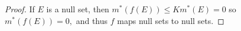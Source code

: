 \documentclass{article}
\begin{document}
\begin{itemize}
\begin{proof}
			If $E$ is a null set, then $m^*(f(E))\le Km^*(E)=0$ so $m^*(f(E))=0,$ and thus $f$ maps null sets to null sets.
		\end{proof}
		
\end{itemize}
\end{document}
